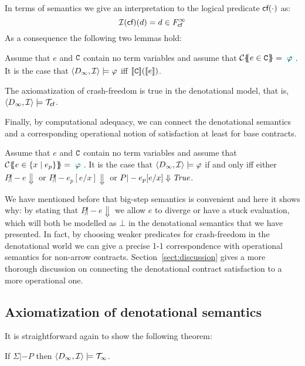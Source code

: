 In terms of semantics we give an interpretation to the logical predicate $\lcf{\cdot}$ as:
\[           \linterp{\lcfZ}(d) = d \in F_\lcfZ^\infty  \] 
As a consequence the following two lemmas hold: 

\begin{theorem}\label{thm:den-contr-satisfaction} Assume that $e$ and $\Ct$ contain no term variables and 
assume that $\ctrans{}{\cdot}{e \in \Ct} = \formula{\phi}$. It is the case 
that $\langle D_\infty,{\cal I}\rangle \models \phi$ iff $\dbrace{\Ct}(\dbrace{e})$.
\end{theorem} 
\begin{theorem}\label{thm:models-cf} The axiomatization of crash-freedom is true in the denotational model, that is, $\langle D_\infty,{\cal I}\rangle \models \Th_\lcfZ$.
\end{theorem}

Finally, by computational adequacy, we can connect the denotational semantics and 
a corresponding operational notion of satisfaction at least for base contracts. 

\begin{corollary} Assume that $e$ and $\Ct$ contain no term variables and 
assume that $\ctrans{}{\cdot}{e \in \{x \mid e_p\}} = \formula{\phi}$. It is the case 
that $\langle D_\infty,{\cal I}\rangle \models \phi$ if and only iff either
$P \not|- e \Downarrow$ or $P \not|- e_p[e/x] \Downarrow$ or $P |- e_p[e/x] \Downarrow \True$.
\end{corollary}
We have mentioned before that big-step semantics is convenient and here it shows why: by 
stating that $P \not|- e \Downarrow$ we allow $e$ to diverge or have a stuck evaluation, 
which will both be modelled as $\bot$ in the denotational semantics that we have presented.
In fact, by choosing weaker predicates for crash-freedom in the denotational world we can
give a precise 1-1 correspondence with operational semantics for non-arrow contracts. 
Section~\ref{sect:discussion} gives a more thorough discussion on connecting 
the denotational contract satisfaction to a more operational one.



\subsection{Axiomatization of denotational semantics}


It is straightforward again to show the following theorem: 
\begin{theorem}\label{thm:models-inf}
If $\Sigma |- P$ then $\langle D_{\infty},{\cal I}\rangle \models \Th_\infty$. 
\end{theorem} 

